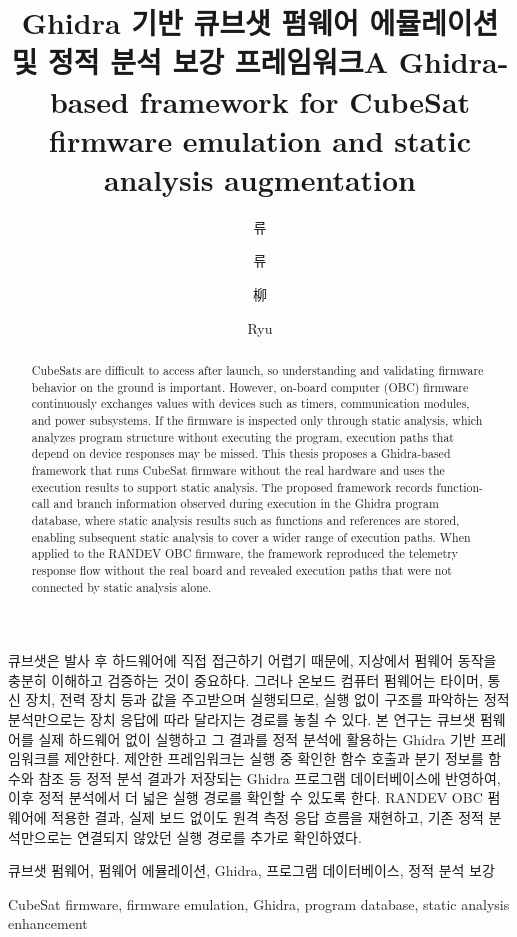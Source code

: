 \documentclass[master,korean,final]{kaist-ucs}
\title[korean] {Ghidra 기반 큐브샛 펌웨어 에뮬레이션 및 정적 분석 보강 프레임워크}
\title[english]{A Ghidra-based framework for CubeSat firmware emulation and static analysis augmentation}
\author[korean] {류}{수 현}
\author[korean2] {류}{수현}
\author[chinese]{柳}{守 炫}
\author[english]{Ryu}{Suhyeon}
\begin{document}
    \thesisinfo

    \begin{summary}
        큐브샛은 발사 후 하드웨어에 직접 접근하기 어렵기 때문에, 지상에서 펌웨어 동작을 충분히 이해하고 검증하는 것이 중요하다. 그러나 온보드 컴퓨터 펌웨어는 타이머, 통신 장치, 전력 장치 등과 값을 주고받으며 실행되므로, 실행 없이 구조를 파악하는 정적 분석만으로는 장치 응답에 따라 달라지는 경로를 놓칠 수 있다. 본 연구는 큐브샛 펌웨어를 실제 하드웨어 없이 실행하고 그 결과를 정적 분석에 활용하는 Ghidra 기반 프레임워크를 제안한다. 제안한 프레임워크는 실행 중 확인한 함수 호출과 분기 정보를 함수와 참조 등 정적 분석 결과가 저장되는 Ghidra 프로그램 데이터베이스에 반영하여, 이후 정적 분석에서 더 넓은 실행 경로를 확인할 수 있도록 한다. RANDEV OBC 펌웨어에 적용한 결과, 실제 보드 없이도 원격 측정 응답 흐름을 재현하고, 기존 정적 분석만으로는 연결되지 않았던 실행 경로를 추가로 확인하였다.
    \end{summary}

    \begin{Korkeyword}
     큐브샛 펌웨어, 펌웨어 에뮬레이션, Ghidra, 프로그램 데이터베이스, 정적 분석 보강
    \end{Korkeyword}

    \begin{abstract}
        CubeSats are difficult to access after launch, so understanding and validating firmware behavior on the ground is important. However, on-board computer (OBC) firmware continuously exchanges values with devices such as timers, communication modules, and power subsystems. If the firmware is inspected only through static analysis, which analyzes program structure without executing the program, execution paths that depend on device responses may be missed. This thesis proposes a Ghidra-based framework that runs CubeSat firmware without the real hardware and uses the execution results to support static analysis. The proposed framework records function-call and branch information observed during execution in the Ghidra program database, where static analysis results such as functions and references are stored, enabling subsequent static analysis to cover a wider range of execution paths. When applied to the RANDEV OBC firmware, the framework reproduced the telemetry response flow without the real board and revealed execution paths that were not connected by static analysis alone.
    \end{abstract} 

     \begin{Engkeyword}
     CubeSat firmware, firmware emulation, Ghidra, program database, static analysis enhancement
    \end{Engkeyword}
\end{document}
